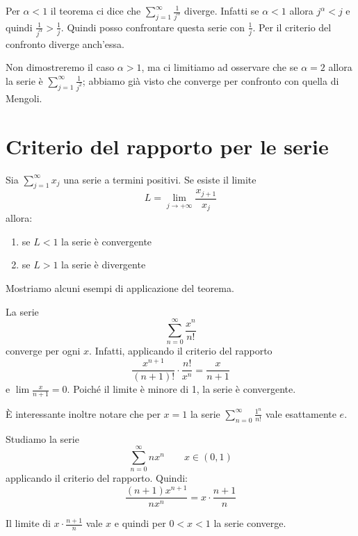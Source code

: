 Per $\alpha < 1$ il teorema ci dice che $\sum_{j=1}^\infty \frac{1}{j^\alpha}$ diverge. Infatti se $\alpha < 1$ allora $j^\alpha < j$ e quindi $\frac{1}{j^\alpha} > \frac{1}{j}$. Quindi posso confrontare questa serie con $\frac{1}{j}$. Per il criterio del confronto diverge anch'essa.

Non dimostreremo il caso $\alpha > 1$, ma ci limitiamo ad osservare che se $\alpha = 2$ allora la serie è $\sum_{j=1}^\infty \frac{1}{j^2}$; abbiamo già visto che converge per confronto con quella di Mengoli.

\section{Criterio del rapporto per le serie}

\begin{theorem}
Sia $\sum_{j=1}^\infty x_j$ una serie a termini positivi. Se esiste il limite
\begin{equation*}
L = \lim_{j \to +\infty} \frac{x_{j+1}}{x_j}
\end{equation*}
allora:
\begin{enumerate}
\item se $L < 1$ la serie è convergente
\item se $L > 1$ la serie è divergente
\end{enumerate}
\end{theorem}

Mostriamo alcuni esempi di applicazione del teorema.
\begin{example}
La serie
\begin{equation*}
\sum_{n=0}^\infty \frac{x^n}{n!}
\end{equation*}
converge per ogni $x$. Infatti, applicando il criterio del rapporto
\begin{equation*}
\frac{x^{n+1}}{(n+1)!} \cdot \frac{n!}{x^n} = \frac{x}{n+1}
\end{equation*}
e $\lim \frac{x}{n+1} = 0$. Poiché il limite è minore di 1, la serie è convergente.

È interessante inoltre notare che per $x = 1$ la serie $\sum_{n=0}^\infty \frac{1^n}{n!}$ vale esattamente $e$.
\end{example}

\begin{example}
Studiamo la serie
\begin{equation*}
\sum_{n=0}^\infty nx^n \qquad x \in (0,1)
\end{equation*}
applicando il criterio del rapporto. Quindi:
\begin{equation*}
\frac{(n+1)x^{n+1}}{nx^n} = x \cdot \frac{n+1}{n}
\end{equation*}

Il limite di $x \cdot \frac{n+1}{n}$ vale $x$ e quindi per $0 < x < 1$ la serie converge.
\end{example}


